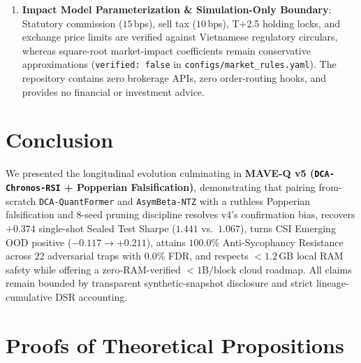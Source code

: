 \documentclass[11pt]{article}
\begin{document}
\begin{enumerate}[leftmargin=1.4em]
  \item \textbf{Impact Model Parameterization \& Simulation-Only Boundary}: Statutory commission ($15$\,bps), sell tax ($10$\,bps), T+2.5 holding locks, and exchange price limits are verified against Vietnamese regulatory circulars, whereas square-root market-impact coefficients remain conservative approximations (\texttt{verified: false} in \texttt{configs/market\_rules.yaml}). The repository contains zero brokerage APIs, zero order-routing hooks, and provides no financial or investment advice.
\end{enumerate}

\section{Conclusion}
\label{sec:conclusion}
We presented the longitudinal evolution culminating in \textbf{MAVE-Q v5 (\texttt{DCA-Chronos-RSI} + Popperian Falsification)}, demonstrating that pairing from-scratch \texttt{DCA-QuantFormer} and \texttt{AsymBeta-NTZ} with a ruthless Popperian falsification and 8-seed pruning discipline resolves v4's confirmation bias, recovers $+0.374$ single-shot Sealed Test Sharpe ($1.441$ vs.\ $1.067$), turns CSI Emerging OOD positive ($-0.117 \to +0.211$), attains $100.0\%$ Anti-Sycophancy Resistance across 22 adversarial traps with $0.0\%$ FDR, and respects $<1.2$\,GB local RAM safety while offering a zero-RAM-verified $<1\text{B}/\text{block}$ cloud roadmap. All claims remain bounded by transparent synthetic-snapshot disclosure and strict lineage-cumulative DSR accounting.




\clearpage
\appendix
\section{Proofs of Theoretical Propositions}
\label{app:proofs}
\end{document}
